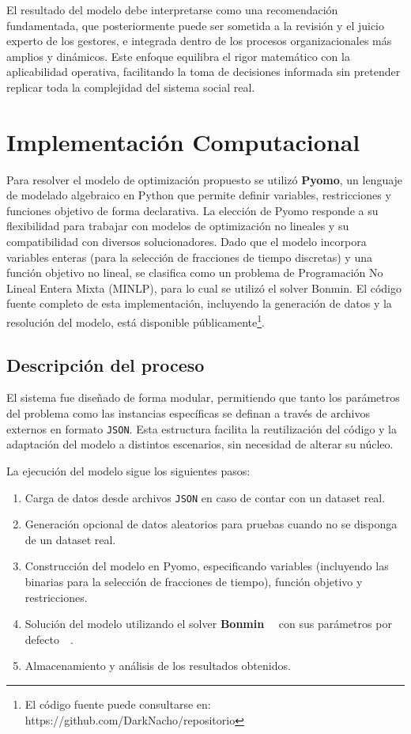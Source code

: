 \documentclass[conference]{IEEEtran}
\begin{document}
El resultado del modelo debe interpretarse como una recomendación fundamentada, que posteriormente puede ser sometida a la revisión y el juicio experto de los gestores, e integrada dentro de los procesos organizacionales más amplios y dinámicos. Este enfoque equilibra el rigor matemático con la aplicabilidad operativa, facilitando la toma de decisiones informada sin pretender replicar toda la complejidad del sistema social real.


\section{Implementación Computacional}

Para resolver el modelo de optimización propuesto se utilizó \textbf{Pyomo}, un lenguaje de modelado algebraico en Python que permite definir variables, restricciones y funciones objetivo de forma declarativa. La elección de Pyomo responde a su flexibilidad para trabajar con modelos de optimización no lineales y su compatibilidad con diversos solucionadores. Dado que el modelo incorpora variables enteras (para la selección de fracciones de tiempo discretas) y una función objetivo no lineal, se clasifica como un problema de Programación No Lineal Entera Mixta (MINLP), para lo cual se utilizó el solver Bonmin. El código fuente completo de esta implementación, incluyendo la generación de datos y la resolución del modelo, está disponible públicamente\footnote{El código fuente puede consultarse en: https://github.com/DarkNacho/repositorio}.

\subsection{Descripción del proceso}

El sistema fue diseñado de forma modular, permitiendo que tanto los parámetros del problema como las instancias específicas se definan a través de archivos externos en formato \texttt{JSON}. Esta estructura facilita la reutilización del código y la adaptación del modelo a distintos escenarios, sin necesidad de alterar su núcleo.

La ejecución del modelo sigue los siguientes pasos:
\begin{enumerate}
    \item Carga de datos desde archivos \texttt{JSON} en caso de contar con un dataset real.
    \item Generación opcional de datos aleatorios para pruebas cuando no se disponga de un dataset real.
    \item Construcción del modelo en Pyomo, especificando variables (incluyendo las binarias para la selección de fracciones de tiempo), función objetivo y restricciones.
    \item Solución del modelo utilizando el solver \textbf{Bonmin} ~~con sus parámetros por defecto~~.
    \item Almacenamiento y análisis de los resultados obtenidos.
\end{enumerate}
\end{document}
